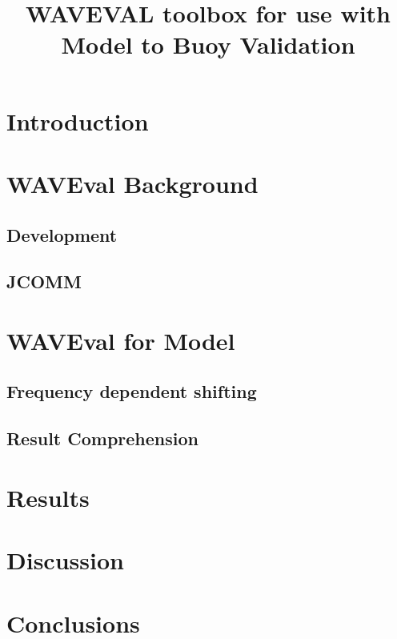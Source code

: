 \documentclass[12pt,letterpaper]{article}
\begin{document}
\title{WAVEVAL toolbox for use with Model to Buoy Validation}
\maketitle
\section{Introduction}

\section{WAVEval Background}
\subsection{Development}
\subsection{JCOMM}

\section{WAVEval for Model}
\subsection{Frequency dependent shifting}
\subsection{Result Comprehension}

\section{Results}

\section{Discussion}

\section{Conclusions}
\end{document}
